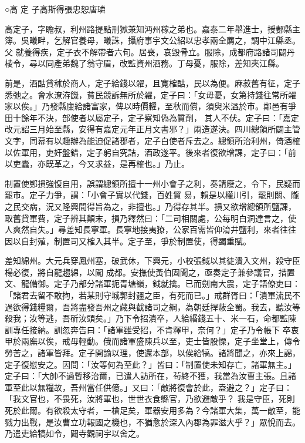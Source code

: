 
\begin{pinyinscope}

 ○高
 定
 子高斯得張忠恕唐璘



 高定子，字瞻叔，利州路提點刑獄兼知沔州稼之弟也。嘉泰二年舉進士，授郪縣主簿。吳曦畔，乞解官養母，曦誅，攝府事宇文公紹以忠孝兩全薦之，調中江縣丞。父
 就養得疾，定子衣不解帶者六旬。居喪，哀毀骨立。服除，成都府路諸司闢丹棱令，尋以同產弟魏了翁守眉，改監資州酒務。丁母憂，服除，差知夾江縣。



 前是，酒酤貸秫於商人，定子給錢以糴，且寬榷酤，民以為便。麻菽舊有征，定子悉弛之。會水潦洊饑，貧民競訴無所於糴，定子曰：「女毋憂，女第持錢往常所糴家以俟。」乃發縣廩給諸富家，俾以時價糶，至秋而償，須臾米溢於市。鄰邑有爭田十餘年不決，部使者以屬定子，定子察知偽為質劑，
 其人不伏。定子曰：「嘉定改元詔三月始至縣，安得有嘉定元年正月文書邪？」兩造遂決。四川總領所闢主管文字，同幕有以趣辦為能迫促諸郡者，定子白使者斥去之。總領所治利州，倚酒榷以佐軍用，吏奸盤錯，定子躬自究詰，酒政遂平。後來者復欲增課，定子曰：「前以吏蠹，亦既革之，今又求益，是再榷也。」乃止。



 制置使鄭損強愎自用，誤謂總領所擅十一州小會子之利，奏請廢之，令下，民疑而罷市。定子力爭，謂：「小會子實以代錢，百姓貿
 易，賴是以權川引，罷則關、隴之民交病，況又隆興間得旨為之，非擅也。」乃得存其半。損又欲增總領所鹽課，取舊貸軍費，定子辨其顛末，損乃釋然曰：「二司相關處，公每明白洞達言之，使人爽然自失。」尋差知長寧軍。長寧地接夷獠，公家百需皆仰淯井鹽利，來者往往因以自封殖，制置司又榷入其半。定子至，爭於制置使，得蠲重賦。



 差知綿州。大元兵穿鳳州塞，破武休，下興元，小校張鉞以其徒潰入文州，殺守臣楊必復，將自龍趨綿，以闖
 成都。安撫使黃伯固聞之，亟奏定子兼參議官，措置文、龍備御。定子乃部分諸軍扼青塘嶺，鉞就擒。已而劍南大震，定子語僚吏曰：「諸君去留不敢拘，若某則守城郭封疆之臣，有死而已。」戒群胥曰：「潰軍流民不過欲得錢糧爾，吾將盡發吾州之藏與截諸司之綱，為朝廷捍蔽全蜀。我去，聽汝等殺我；汝等逃，吾斫汝頭矣。」乃下令招潰卒，人給緡錢五十、米一石，命都監陳訓專任接納。訓忽奔告曰：「諸軍雖受招，不肯釋甲，奈何？」定子乃令帳下
 卒衷甲於兩廡以俟，戒毋輕動。俄而諸軍盛陳兵以至，吏士皆股慄，定子坐堂上，傳令勞苦之，諸軍皆拜。定子開諭以理，使還本部，以俟給犒。諸將聞之，亦來上謁，定子復慰安之。因問：「汝等何為至此？」皆曰：「制置使未知存亡，諸軍無主。」定子曰：「大帥不過暫移治爾，已遣人訪所在，茍終不獲，我當為汝曹主張。且諸軍至此以無糧故，吾州當任供億。」又曰：「敵將復會於此，盍避之？」定子曰：「我文官也，不畏死，汝將軍也，世世衣食縣官，乃欲避敵乎？
 我是守臣，死則死於此爾。有欲殺太守者，一槍足矣，軍器安用多為？今諸軍大集，萬一敵至，能戮力出戰，是汝曹立功報國之機也，不猶愈於深入內郡為罪滋大乎？」眾悅而去。乃遣吏給犒如令，闢寺觀祠宇以舍之。




\end{pinyinscope}
